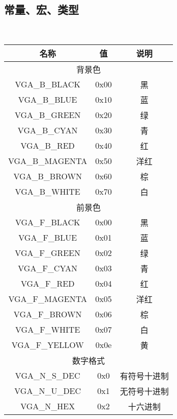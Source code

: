 \subsection{常量、宏、类型}
\\
\begin{tabular}{|c|c|c|}
    \hline
    名称 & 值 & 说明\\\hline
    \multicolumn{3}{|c|}{背景色}\\\hline
    VGA\_B\_BLACK & 0x00 & 黑\\\hline
    VGA\_B\_BLUE & 0x10 & 蓝\\\hline
    VGA\_B\_GREEN & 0x20 & 绿\\\hline
    VGA\_B\_CYAN & 0x30 & 青\\\hline
    VGA\_B\_RED & 0x40 & 红\\\hline
    VGA\_B\_MAGENTA & 0x50 & 洋红\\\hline
    VGA\_B\_BROWN & 0x60 & 棕\\\hline
    VGA\_B\_WHITE & 0x70 & 白\\\hline
    \multicolumn{3}{|c|}{前景色}\\\hline
    VGA\_F\_BLACK & 0x00 & 黑\\\hline
    VGA\_F\_BLUE & 0x01 & 蓝\\\hline
    VGA\_F\_GREEN & 0x02 & 绿\\\hline
    VGA\_F\_CYAN & 0x03 & 青\\\hline
    VGA\_F\_RED & 0x04 & 红\\\hline
    VGA\_F\_MAGENTA & 0x05 & 洋红\\\hline
    VGA\_F\_BROWN & 0x06 & 棕\\\hline
    VGA\_F\_WHITE & 0x07 & 白\\\hline
    VGA\_F\_YELLOW & 0x0e & 黄\\\hline
    \multicolumn{3}{|c|}{数字格式}\\\hline
    VGA\_N\_S\_DEC & 0x0 & 有符号十进制\\\hline
    VGA\_N\_U\_DEC & 0x1 & 无符号十进制\\\hline
    VGA\_N\_HEX & 0x2 & 十六进制\\\hline
\end{tabular}\\
